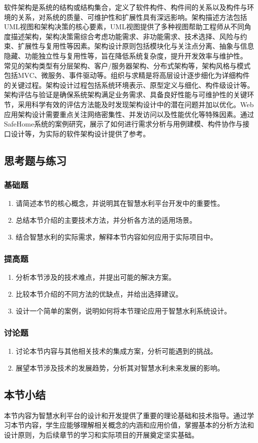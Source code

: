 软件架构是系统的结构或结构集合，定义了软件构件、构件间的关系以及构件与环境的关系，对系统的质量、可维护性和扩展性具有深远影响。架构描述方法包括UML视图和架构决策的核心要素，UML视图提供了多种视图帮助工程师从不同角度描述架构，架构决策需综合考虑功能需求、非功能需求、技术选择、风险与约束、扩展性与复用性等因素。架构设计原则包括模块化与关注点分离、抽象与信息隐藏、功能独立性与复用性等，旨在降低系统复杂度，提升开发效率与维护性。 常见的架构类型有分层架构、客户/服务器架构、分布式架构等，架构风格与模式包括MVC、微服务、事件驱动等。组织与求精是将高层设计逐步细化为详细构件的关键过程。架构设计过程包括系统环境表示、原型定义与细化、构件级设计等。架构评估与验证是确保系统架构满足业务需求、具备良好性能与可维护性的关键环节，采用科学有效的评估方法能及时发现架构设计中的潜在问题并加以优化。Web应用架构设计需要重点关注网络密集性、并发访问以及性能优化等特殊因素。通过SafeHome系统的案例研究，展示了如何进行需求分析与用例建模、构件协作与接口设计等，为实际的软件架构设计提供了参考。 \subsection{思考题与练习}\label{ux601dux8003ux9898ux4e0eux7ec3ux4e60} \subsubsection{基础题}\label{ux57faux7840ux9898} \begin{enumerate} \def\labelenumi{\arabic{enumi}.} \item 请简述本节的核心概念，并说明其在智慧水利平台开发中的重要性。 \item 总结本节介绍的主要技术方法，并分析各方法的适用场景。 \item 结合智慧水利的实际需求，解释本节内容如何应用于实际项目中。 \end{enumerate} \subsubsection{提高题}\label{ux63d0ux9ad8ux9898} \begin{enumerate} \def\labelenumi{\arabic{enumi}.} \setcounter{enumi}{3} \item 分析本节涉及的技术难点，并提出可能的解决方案。 \item 比较本节介绍的不同方法的优缺点，并给出选择建议。 \item 设计一个简单的案例，说明如何将本节理论应用于智慧水利系统设计。 \end{enumerate} \subsubsection{讨论题}\label{ux8ba8ux8bbaux9898} \begin{enumerate} \def\labelenumi{\arabic{enumi}.} \setcounter{enumi}{6} \item 讨论本节内容与其他相关技术的集成方案，分析可能遇到的挑战。 \item 展望本节涉及技术的发展趋势，分析其对智慧水利未来发展的影响。 \end{enumerate} \subsection{本节小结}\label{ux672cux8282ux5c0fux7ed3} 本节内容为智慧水利平台的设计和开发提供了重要的理论基础和技术指导。通过学习本节内容，学生应能够理解相关概念的内涵和应用价值，掌握基本的分析方法和设计原则，为后续章节的学习和实际项目的开展奠定坚实基础。
